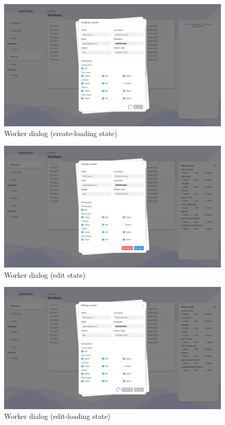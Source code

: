 \documentclass[a4paper, 12pt, oneside]{book}
\begin{document}
\begin{figure}[h!]
	\centering
	\includegraphics[width=\textwidth]{assets/ui/WorkersCreateLoading.png}
	\caption{Worker dialog (create-loading state)}
\end{figure}
\begin{figure}[h!]
	\centering
	\includegraphics[width=\textwidth]{assets/ui/WorkersEdit.png}
	\caption{Worker dialog (edit state)}
\end{figure}
\begin{figure}[h!]
	\centering
	\includegraphics[width=\textwidth]{assets/ui/WorkersEditLoading.png}
	\caption{Worker dialog (edit-loading state)}
\end{figure}
\end{document}
